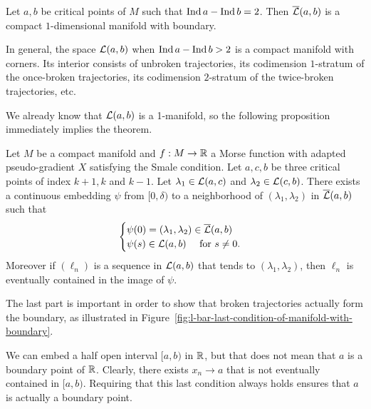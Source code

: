 \begin{theorem}
    Let $a, b$ be critical points of  $M$ such that  $\operatorname{Ind} a - \operatorname{Ind} b = 2$. Then  $\overline{\mathcal L}(a, b)$ is a compact  $1$-dimensional manifold with boundary.
\end{theorem}

\begin{remark}
    In general, the space $\mathcal L(a, b) $ when $\operatorname{Ind} a - \operatorname{Ind} b > 2$ is a compact manifold with corners.
    Its interior consists of unbroken trajectories, its codimension $1$-stratum of the once-broken trajectories, its codimension $2$-stratum of the twice-broken trajectories, etc.
\end{remark}

We already know that $\mathcal L(a, b)$ is a 1-manifold, so the following proposition immediately implies the theorem.

\begin{prop}
    Let $M$ be a compact manifold and $f: M \to  \mathbb{R}$ a Morse function with adapted pseudo-gradient $X$ satisfying the Smale condition. Let  $a,c,b$ be three critical points of index $k+1, k$ and $k-1$. Let $\lambda_1 \in \mathcal L(a, c)$ and $\lambda_2 \in \mathcal L(c, b)$.
    There exists a continuous embedding $\psi$ from $[0, \delta)$ to a neighborhood of $(\lambda_1, \lambda_2)$ in $\overline{\mathcal L}(a, b)$ such that
    \[
    \begin{cases}
        \psi(0) = (\lambda_1, \lambda_2) \in \overline{\mathcal L}(a, b)\\
        \psi(s) \in \mathcal L(a, b) \quad \text{ for } s \neq 0.
    \end{cases}
    \] 
    Moreover if $(\ell_n)$ is a sequence in $\mathcal L(a, b)$ that tends to $(\lambda_1, \lambda_2)$, then $ \ell_n$ is eventually contained in the image of $\psi$.
\end{prop}

The last part is important in order to show that broken trajectories actually form the boundary, as illustrated in Figure~\ref{fig:l-bar-last-condition-of-manifold-with-boundary}.
\begin{marginfigure}
    \centering
    \caption{We can embed a half open interval $[a, b)$ in $\mathbb{R}$, but that does not mean that $a$ is a boundary point of $\mathbb{R}$. Clearly, there exists $x_n \to a$ that is not eventually contained in $[a,b)$.
        Requiring that this last condition always holds ensures that $a$ is actually a boundary point.
    }
    \label{fig:l-bar-last-condition-of-manifold-with-boundary}
\end{marginfigure}


